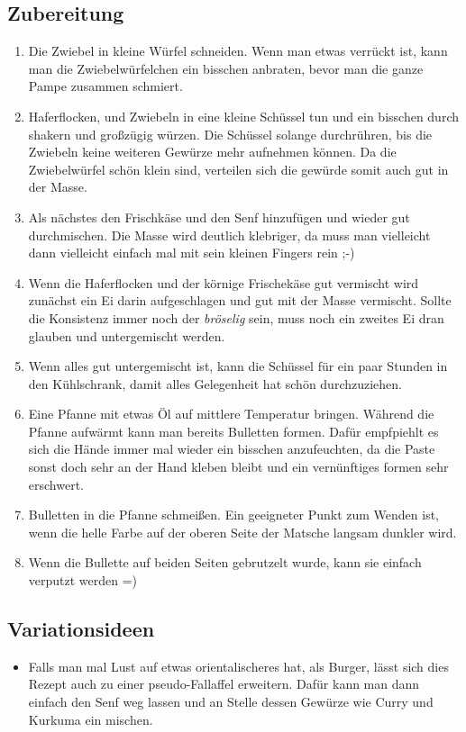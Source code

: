   \subsection*{Zubereitung}
    \begin{enumerate}
      \item Die Zwiebel in kleine Würfel schneiden. Wenn man etwas verrückt ist,
            kann man die Zwiebelwürfelchen ein bisschen anbraten, bevor man die
            ganze Pampe zusammen schmiert.
      \item Haferflocken, und Zwiebeln in eine kleine Schüssel tun und ein
            bisschen durch shakern und großzügig würzen. Die Schüssel solange
            durchrühren, bis die Zwiebeln keine weiteren Gewürze mehr aufnehmen
            können. Da die Zwiebelwürfel schön klein sind, verteilen sich die
            gewürde somit auch gut in der Masse.
      \item Als nächstes den Frischkäse und den Senf hinzufügen und wieder gut
            durchmischen. Die Masse wird deutlich klebriger, da muss man
            vielleicht dann vielleicht einfach mal mit sein kleinen Fingers rein
            ;-)
      \item Wenn die Haferflocken und der körnige Frischekäse gut vermischt
            wird zunächst ein Ei darin aufgeschlagen und gut mit der Masse
            vermischt. Sollte die Konsistenz immer noch der \emph{bröselig}
            sein, muss noch ein zweites Ei dran glauben und untergemischt
            werden.
      \item Wenn alles gut untergemischt ist, kann die Schüssel für ein paar
            Stunden in den Kühlschrank, damit alles Gelegenheit hat schön
            durchzuziehen.
      \item Eine Pfanne mit etwas Öl auf mittlere Temperatur bringen.
            Während die Pfanne aufwärmt kann man bereits Bulletten formen.
            Dafür empfpiehlt es sich die
            Hände immer mal wieder ein bisschen anzufeuchten, da die Paste sonst
            doch sehr an der Hand kleben bleibt und ein vernünftiges formen sehr
            erschwert.
      \item Bulletten in die Pfanne schmeißen. Ein geeigneter Punkt zum Wenden
            ist, wenn die helle Farbe auf der oberen Seite der Matsche langsam
            dunkler wird.
      \item Wenn die Bullette auf beiden Seiten gebrutzelt wurde, kann sie
            einfach verputzt werden =)
    \end{enumerate}

  \subsection*{Variationsideen}
    \begin{itemize}
      \item Falls man mal Lust auf etwas orientalischeres hat, als Burger, lässt
            sich dies Rezept auch zu einer pseudo-Fallaffel erweitern. Dafür
            kann man dann einfach den Senf weg lassen und an Stelle dessen
            Gewürze wie Curry und Kurkuma ein mischen.
    \end{itemize}
